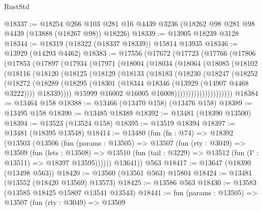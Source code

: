 \begin{lexlean}{RustStd}
\begin{coremodule}
@18337 := @18254
    @266
    @103
    @281
    @16
    @4439
    @3236
    (@18262 @98 @281 @98 @4439 (@13888 (@18267 @98)) @18226)
@18339 := @13905 @18239 @3128
@18344 := @18319 (@18322 (@18337 @18339)) @15814 @13935
@18346 := @13929 (@14293 @4462)
@18383 := @17556
    (@17672
      (@17723
        (@17766
          (@17806
            (@17853
              (@17897
                (@17934
                  (@17971
                    (@18004
                      (@18034
                        (@18064
                          (@18085
                            (@18102
                              (@18116
                                (@18120
                                  (@18125
                                    (@18129
                                      (@18133
                                        (@18183
                                          (@18230
                                            (@18247
                                              (@18252
                                                (@18272
                                                  (@18289
                                                    (@18295
                                                      (@18301
                                                        (@18344
                                                          @18346
                                                          (@13929 (@14907 @4468 @3222))))
                                                      @18339))))
                                              @15999
                                              @16002
                                              @16005
                                              @16008)))))))))))))))))))))
@18384 := @13464 @158
@18388 := @13466 (@13470 @158) (@13476 @158)
@18389 := @13495 @158
@18390 := @13485 @18389
@18392 := @13481 (@18390 @13500)
@18394 := @13523 (@13524 @158)
@18395 := @13519 @18394
@18397 := @13481 (@18395 @13548)
@18414 := @13480
    (fun (fn : @74) =>
    @18392
      (@13503
        (@13506
          (fun (params : @13505) =>
          @13507
            (fun (rty : @3049) =>
            @13509
              (fun (lets : @13508) =>
              @13510 (fun (tail : @3229) => @13512 (fun (Γ : @13511) => @18397 @13595))))))
        @13641))
    @563
@18417 := @13647 (@18390 (@13498 @563))
@18420 := @13560 (@13561 @563) @15804
@18424 := @13481 (@13552 (@18420 @13569) @13573)
@18425 := @13586 @563
@18430 := @13583 (@13585 @18425 @15807 @13541 @13543)
@18441 := fun (params : @13505) =>
  @13507
    (fun (rty : @3049) =>
    @13509

\end{coremodule}
\end{lexlean}
